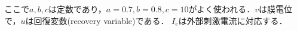 ここで$a,b,c$は定数であり，$a=0.7, b=0.8, c=10$がよく使われる．$v$は膜電位で，$u$は回復変数(recovery variable)である． $I_e$は外部刺激電流に対応する．
